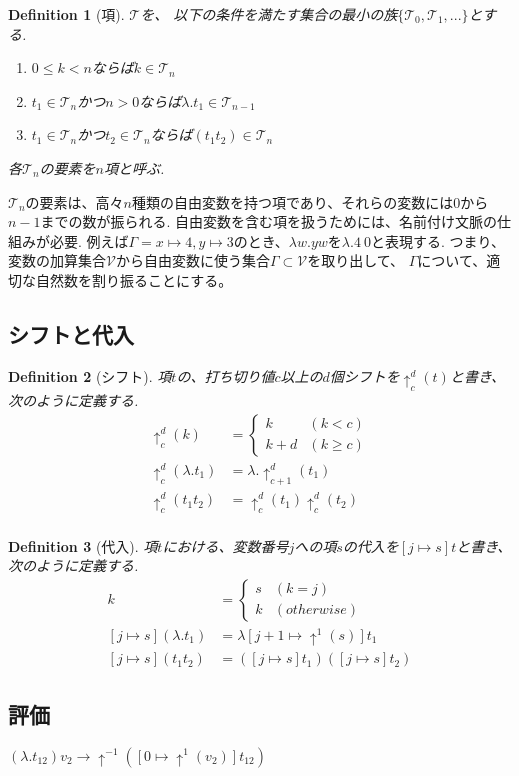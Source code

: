 \documentclass[a4paper,10pt]{article}
\newtheorem{definition}{Definition}[section]
\begin{document}
\begin{definition}[項]
    $\mathcal{T}$を、
    以下の条件を満たす集合の最小の族$\{\mathcal{T}_0, \mathcal{T}_1,...\}$とする.
    \begin{enumerate}
        \item $ 0 \leq k < n$ならば$k \in \mathcal{T}_n$
        \item $t_1 \in \mathcal{T}_n$かつ$n > 0$ならば$\lambda. t_1 \in \mathcal{T}_{n-1}$
        \item $t_1 \in \mathcal{T}_n$かつ$t_2 \in \mathcal{T}_n$ならば$(t_1 t_2) \in \mathcal{T}_n$
    \end{enumerate}
    各$\mathcal{T}_n$の要素を$n$項と呼ぶ.
\end{definition}
$\mathcal{T}_n$の要素は、高々$n$種類の自由変数を持つ項であり、それらの変数には$0$から$n-1$までの数が振られる.
自由変数を含む項を扱うためには、名前付け文脈の仕組みが必要.
例えば$\Gamma = x \mapsto 4, y \mapsto 3$のとき、$\lambda w. y w$を$\lambda. 4\ 0$と表現する.
つまり、変数の加算集合$\mathcal{V}$から自由変数に使う集合$\Gamma \subset \mathcal{V}$を取り出して、
$\Gamma$について、適切な自然数を割り振ることにする。

\subsection*{シフトと代入}
\begin{definition}[シフト]
    項$t$の、打ち切り値$c$以上の$d$個シフトを$\uparrow_{c}^d(t)$と書き、次のように定義する.
    \begin{align*}
        \uparrow_{c}^d(k) &=
        \begin{cases}
            k & (k < c)\\
            k + d & (k \geq c)
        \end{cases}\\
        \uparrow_{c}^d (\lambda. t_1) &= \lambda. \uparrow_{c+1}^d(t_1)\\
        \uparrow_{c}^d (t_1 t_2) &= \uparrow_{c}^d (t_1) \uparrow_c^d(t_2)\\
    \end{align*}
\end{definition}
\begin{definition}[代入]
    項$t$における、変数番号$j$への項$s$の代入を$[j \mapsto s]t$と書き、次のように定義する.
    \begin{align*}
        [j \mapsto s]k &=
        \begin{cases}
            s & (k = j)\\
            k & (otherwise)
        \end{cases}\\
        [j \mapsto s](\lambda. t_1) &= \lambda [j + 1 \mapsto \uparrow^1(s)]t_1\\
        [j \mapsto s](t_1 t_2) &= ([j \mapsto s] t_1)([j \mapsto s] t_2)
    \end{align*}
\end{definition}
\subsection*{評価}
$(\lambda. t_{12}) v_2 \rightarrow \uparrow^{-1}([0 \mapsto \uparrow^{1}(v_2)]t_{12})$
\end{document}
